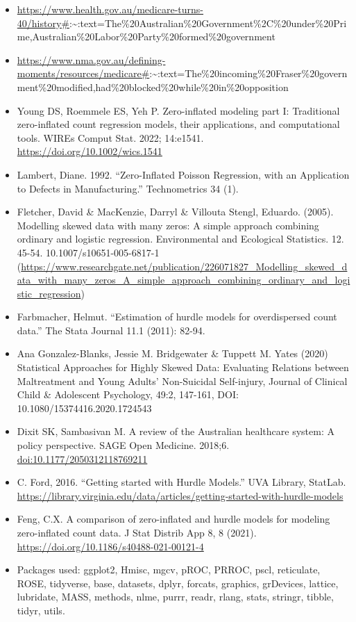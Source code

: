 \documentclass[
]{article}
\begin{document}
\begin{itemize}
\item
  \url{https://www.health.gov.au/medicare-turns-40/history\#}:\textasciitilde:text=The\%20Australian\%20Government\%2C\%20under\%20Prime,Australian\%20Labor\%20Party\%20formed\%20government
\item
  \url{https://www.nma.gov.au/defining-moments/resources/medicare\#}:\textasciitilde:text=The\%20incoming\%20Fraser\%20government\%20modified,had\%20blocked\%20while\%20in\%20opposition
\item
  Young DS, Roemmele ES, Yeh P. Zero-inflated modeling part I:
  Traditional zero-inflated count regression models, their applications,
  and computational tools. WIREs Comput Stat. 2022; 14:e1541.
  \url{https://doi.org/10.1002/wics.1541}
\item
  Lambert, Diane. 1992. ``Zero-Inflated Poisson Regression, with an
  Application to Defects in Manufacturing.'' Technometrics 34 (1).
\item
  Fletcher, David \& MacKenzie, Darryl \& Villouta Stengl, Eduardo.
  (2005). Modelling skewed data with many zeros: A simple approach
  combining ordinary and logistic regression. Environmental and
  Ecological Statistics. 12. 45-54. 10.1007/s10651-005-6817-1
  (\url{https://www.researchgate.net/publication/226071827_Modelling_skewed_data_with_many_zeros_A_simple_approach_combining_ordinary_and_logistic_regression})
\item
  Farbmacher, Helmut. ``Estimation of hurdle models for overdispersed
  count data.'' The Stata Journal 11.1 (2011): 82-94.
\item
  Ana Gonzalez-Blanks, Jessie M. Bridgewater \& Tuppett M. Yates (2020)
  Statistical Approaches for Highly Skewed Data: Evaluating Relations
  between Maltreatment and Young Adults' Non-Suicidal Self-injury,
  Journal of Clinical Child \& Adolescent Psychology, 49:2, 147-161,
  DOI: 10.1080/15374416.2020.1724543
\item
  Dixit SK, Sambasivan M. A review of the Australian healthcare system:
  A policy perspective. SAGE Open Medicine. 2018;6.
  \url{doi:10.1177/2050312118769211}
\item
  C. Ford, 2016. ``Getting started with Hurdle Models.'' UVA Library,
  StatLab.
  \url{https://library.virginia.edu/data/articles/getting-started-with-hurdle-models}
\item
  Feng, C.X. A comparison of zero-inflated and hurdle models for
  modeling zero-inflated count data. J Stat Distrib App 8, 8 (2021).
  \url{https://doi.org/10.1186/s40488-021-00121-4}
\item
  Packages used: ggplot2, Hmisc, mgcv, pROC, PRROC, pscl, reticulate,
  ROSE, tidyverse, base, datasets, dplyr, forcats, graphics, grDevices,
  lattice, lubridate, MASS, methods, nlme, purrr, readr, rlang, stats,
  stringr, tibble, tidyr, utils.
\end{itemize}
\end{document}
